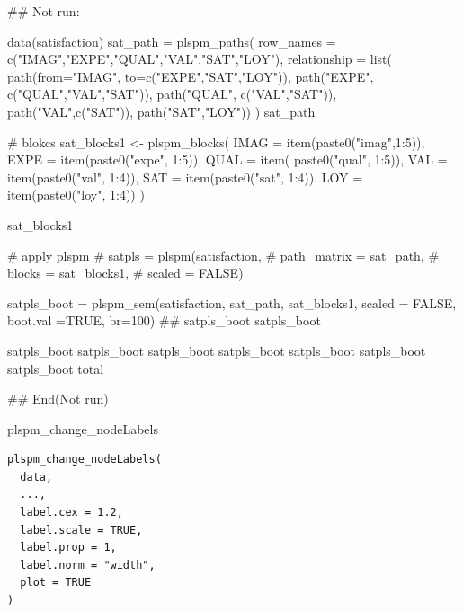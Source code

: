 \documentclass[a4paper]{book}
\begin{document}
\begin{Examples}
\begin{ExampleCode}

## Not run: 

data(satisfaction)
sat_path = plspm_paths(
  row_names = c("IMAG","EXPE","QUAL","VAL","SAT","LOY"),
  relationship = list(
    path(from="IMAG", to=c("EXPE","SAT","LOY")),
    path("EXPE", c("QUAL","VAL","SAT")),
    path("QUAL", c("VAL","SAT")),
    path("VAL",c("SAT")),
    path("SAT","LOY"))
)
sat_path

# blokcs
sat_blocks1 <- plspm_blocks(
  IMAG = item(paste0("imag",1:5)),
  EXPE = item(paste0("expe", 1:5)),
  QUAL = item( paste0("qual", 1:5)),
  VAL = item(paste0("val", 1:4)),
  SAT = item(paste0("sat", 1:4)),
  LOY = item(paste0("loy", 1:4))
)

sat_blocks1

# apply plspm
# satpls = plspm(satisfaction,
#                path_matrix = sat_path,
#                blocks = sat_blocks1,
#                scaled = FALSE)

satpls_boot = plspm_sem(satisfaction, sat_path, sat_blocks1, scaled = FALSE,
                        boot.val =TRUE, br=100)
##
satpls_boot%
satpls_boot%

satpls_boot%
satpls_boot%
satpls_boot%
satpls_boot%
satpls_boot%
satpls_boot%
satpls_boot%
total

## End(Not run)


\end{ExampleCode}
\end{Examples}
%
\begin{Description}
plspm\_change\_nodeLabels
\end{Description}
%
\begin{Usage}
\begin{verbatim}
plspm_change_nodeLabels(
  data,
  ...,
  label.cex = 1.2,
  label.scale = TRUE,
  label.prop = 1,
  label.norm = "width",
  plot = TRUE
)
\end{verbatim}
\end{Usage}
%
\end{document}
